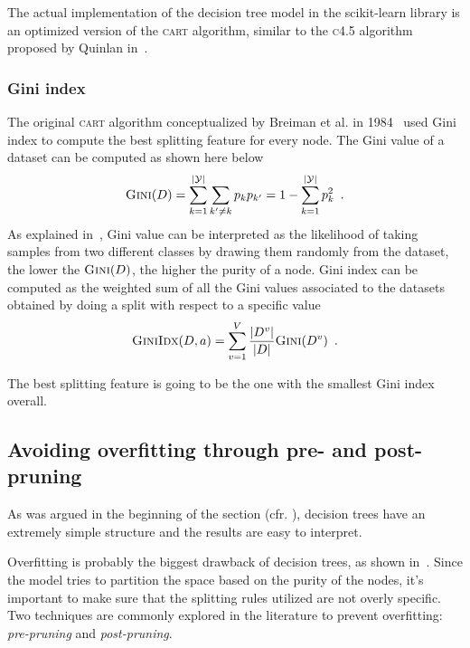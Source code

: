 The actual implementation of the decision tree model in the scikit-learn library is an optimized version of the \textsc{cart} algorithm, similar to the \textsc{c4.5} algorithm proposed by Quinlan in~\cite{quinlan2014c4}.

\subsubsection{Gini index}
The original \textsc{cart} algorithm conceptualized by Breiman et al. in
1984~\cite{breiman1984classification} used Gini index to compute the best splitting feature for
every node. The Gini value of a dataset can be computed as shown here below
\begin{equation}
	\label{eq:gini-value}
	\textsc{Gini}(D) = \sum_{k = 1}^{|\mathcal{Y}|}\sum_{k' \neq k} p_kp_{k'} = 1 - \sum_{k =
		1}^{|\mathcal{Y}|}p_k^2 \enspace.
\end{equation}
As explained in~\cite{ZhouZhi-Hua2021ML}, Gini value can be interpreted as the
likelihood of taking samples from two different classes by drawing them randomly from the
dataset, the lower the $\textsc{Gini}(D)$, the higher the purity of a node. Gini index can be
computed as the weighted sum of all the Gini values associated to the datasets obtained by doing a
split with respect to a specific value
\begin{equation}
	\label{eq:gini-index}
	\textsc{GiniIdx}(D,a) = \sum_{v = 1}^V\frac{|D^v|}{|D|} \textsc{Gini}(D^v) \enspace.
\end{equation}

The best splitting feature is going to be the one with the smallest Gini index overall.

\subsection{Avoiding overfitting through pre- and post- pruning}
As was argued in the beginning of the section (cfr. ), decision trees have an extremely simple structure and the results are easy to interpret.

Overfitting is probably the biggest drawback of decision trees, as shown in~\cite{overfitting-dt-erblin}. Since the model tries to partition the space based on the purity of the nodes, it's important to make sure that the splitting rules utilized are not overly specific. Two techniques are commonly explored in the literature to prevent overfitting: \emph{pre-pruning} and \emph{post-pruning}.

\smallskip

